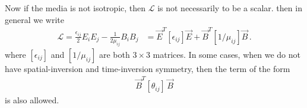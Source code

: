 \documentclass[11pt, onesided]{book}
\theoremstyle{break}
\theoremstyle{break}
\begin{document}
Now if the media is not isotropic, then $\mathcal{L}$ is not necessarily to be a scalar. then in general we write
\begin{align*}
\mathcal{L} = \frac{\epsilon_{ij}}{2}E_iE_j - \frac{1}{2\mu_{ij}}B_i B_j
&= \vec{E}^T [\epsilon_{ij}] \vec{E} + \vec{B}^T [1/\mu_{ij}]\vec{B}\,.
\end{align*}
where $[\epsilon_{ij}]$ and $[1/\mu_{ij}]$ are both $3\times 3$ matrices. In some cases, when we do not have spatial-inversion and time-inversion symmetry, then the term of the form
\begin{align*}
\vec{B}^T [\theta_{ij} ]\, \vec{B}
\end{align*}
is also allowed. 
\end{document}
